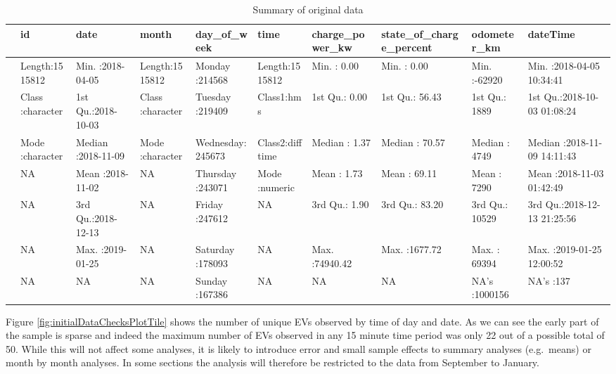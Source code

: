 \documentclass[]{article}
\begin{document}
\begin{table}[t]

\caption{\label{tab:summaryRaw}Summary of original data}
\centering
\begin{tabular}{l|l|l|l|l|l|l|l|l|l}
\hline
  &      id &      date &    month &    day\_of\_week &     time & charge\_power\_kw & state\_of\_charge\_percent &  odometer\_km &    dateTime\\
\hline
 & Length:1515812 & Min.   :2018-04-05 & Length:1515812 & Monday   :214568 & Length:1515812 & Min.   :    0.00 & Min.   :   0.00 & Min.   :-62920 & Min.   :2018-04-05 10:34:41\\
\hline
 & Class :character & 1st Qu.:2018-10-03 & Class :character & Tuesday  :219409 & Class1:hms & 1st Qu.:    0.00 & 1st Qu.:  56.43 & 1st Qu.:  1889 & 1st Qu.:2018-10-03 01:08:24\\
\hline
 & Mode  :character & Median :2018-11-09 & Mode  :character & Wednesday:245673 & Class2:difftime & Median :    1.37 & Median :  70.57 & Median :  4749 & Median :2018-11-09 14:11:43\\
\hline
 & NA & Mean   :2018-11-02 & NA & Thursday :243071 & Mode  :numeric & Mean   :    1.73 & Mean   :  69.11 & Mean   :  7290 & Mean   :2018-11-03 01:42:49\\
\hline
 & NA & 3rd Qu.:2018-12-13 & NA & Friday   :247612 & NA & 3rd Qu.:    1.90 & 3rd Qu.:  83.20 & 3rd Qu.: 10529 & 3rd Qu.:2018-12-13 21:25:56\\
\hline
 & NA & Max.   :2019-01-25 & NA & Saturday :178093 & NA & Max.   :74940.42 & Max.   :1677.72 & Max.   : 69394 & Max.   :2019-01-25 12:00:52\\
\hline
 & NA & NA & NA & Sunday   :167386 & NA & NA & NA & NA's   :1000156 & NA's   :137\\
\hline
\end{tabular}
\end{table}

Figure \ref{fig:initialDataChecksPlotTile} shows the number of unique EVs observed by time of day and date. As we can see the early part of the sample is sparse and indeed the maximum number of EVs observed in any 15 minute time period was only 22 out of a possible total of 50. While this will not affect some analyses, it is likely to introduce error and small sample effects to summary analyses (e.g.~means) or month by month analyses. In some sections the analysis will therefore be restricted to the data from September to January.
\end{document}
